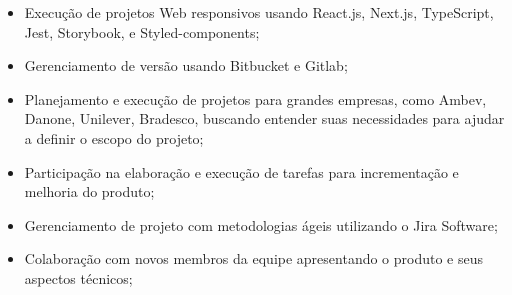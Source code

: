 \documentclass[10pt,a4paper,ragged2e]{altacv}
\begin{document}
\divider

\begin{itemize}
\item Execução de projetos Web responsivos usando React.js, Next.js, TypeScript, Jest, Storybook, e Styled-components;  
\item Gerenciamento de versão usando Bitbucket e Gitlab;
\item Planejamento e execução de projetos para grandes empresas, como Ambev, Danone, Unilever, Bradesco, buscando entender suas necessidades para ajudar a definir o escopo do projeto;
\item Participação na elaboração e execução de tarefas para incrementação e melhoria do produto;
\item Gerenciamento de projeto com metodologias ágeis utilizando o Jira Software;
\item Colaboração com novos membros da equipe apresentando o produto e seus aspectos técnicos;
\end{itemize}


\clearpage
\end{document}
